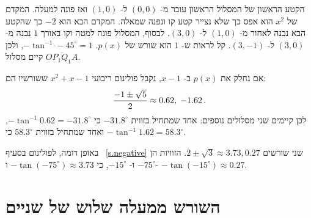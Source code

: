 
\vspace{-10ex}
הקטע הראשון של המסלול הראשון עובר מ-%
$(0,0)$
ל-%
$(1,0)$
ואז פונה למעלה. המקדם של
$x^2$
הוא אפס כך שלא נצייר קטע קו ונפנה שמאלה. המקדם הבא הוא
$-2$
כך שהקטע הבא נבנה לאחור מ-%
$(1,0)$
ל-%
$(3,0)$.
לבסוף, המסלול פונה למטה וקו באורך 
$1$
נבנה מ-%
$(3,0)$
ל-%
$(3,-1)$.
קל לראות ש-%
$1$
הוא שורש של
$p(x)$.
$-\tan^{-1} -45^\circ=1$,
ולכן קיים מסלול
$\overline{OP_1Q_1A}$.

אם נחלק את
$p(x)$
ב-%
$x-1$,
נקבל פולינום ריבועי
$x^2+x-1$
ששורשיו הם:
\[
\displaystyle\frac{-1\pm\sqrt{5}}{2} \approx 0.62,\; -1.62\,.
\]
לכן קיימים שני מסלולים נוספים: אחד שמתחיל בזווית
$-31.8^\circ$
כי
$-\tan^{-1} 0.62=-31.8^\circ$,
ואחד שמתחיל בזווית
$58.3^\circ$
כי
$-\tan^{-1}1.62=58.3^\circ$.

באופן דומה, לפולינום בסעיף%
~\ref{s.negative}
שני שורשים
$ 2\pm\sqrt{3}\approx 3.73, 0.27$.
הזוויות הן
$-75^\circ$
ו-%
$-15^\circ$,
כי
$-\tan (-75^\circ)\approx 3.73$ 
ו-%
$-\tan (-15^\circ)\approx 0.27$.


\section{השורש ממעלה שלוש של שניים}\label{s.cube-root}

